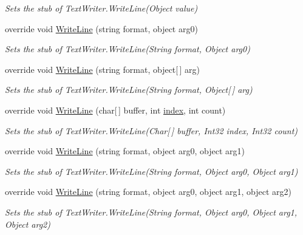 \begin{DoxyCompactItemize}
\begin{DoxyCompactList}\small\item\em Sets the stub of Text\-Writer.\-Write\-Line(\-Object value)\end{DoxyCompactList}\item 
override void \hyperlink{class_system_1_1_i_o_1_1_fakes_1_1_stub_string_writer_a9399eba848835110b6f8b381db729217}{Write\-Line} (string format, object arg0)
\begin{DoxyCompactList}\small\item\em Sets the stub of Text\-Writer.\-Write\-Line(\-String format, Object arg0)\end{DoxyCompactList}\item 
override void \hyperlink{class_system_1_1_i_o_1_1_fakes_1_1_stub_string_writer_adcb3e7de6bdc96c16f9024c023ad8281}{Write\-Line} (string format, object\mbox{[}$\,$\mbox{]} arg)
\begin{DoxyCompactList}\small\item\em Sets the stub of Text\-Writer.\-Write\-Line(\-String format, Object\mbox{[}$\,$\mbox{]} arg)\end{DoxyCompactList}\item 
override void \hyperlink{class_system_1_1_i_o_1_1_fakes_1_1_stub_string_writer_a8146b234e7a472c2e43877a08dd1550a}{Write\-Line} (char\mbox{[}$\,$\mbox{]} buffer, int \hyperlink{jquery-1_810_82-vsdoc_8js_a75bb12d1f23302a9eea93a6d89d0193e}{index}, int count)
\begin{DoxyCompactList}\small\item\em Sets the stub of Text\-Writer.\-Write\-Line(\-Char\mbox{[}$\,$\mbox{]} buffer, Int32 index, Int32 count)\end{DoxyCompactList}\item 
override void \hyperlink{class_system_1_1_i_o_1_1_fakes_1_1_stub_string_writer_aab4cd0d0a6e5036b6289cf15032ade19}{Write\-Line} (string format, object arg0, object arg1)
\begin{DoxyCompactList}\small\item\em Sets the stub of Text\-Writer.\-Write\-Line(\-String format, Object arg0, Object arg1)\end{DoxyCompactList}\item 
override void \hyperlink{class_system_1_1_i_o_1_1_fakes_1_1_stub_string_writer_aa7c104b17411b40a13ad64e361c79cab}{Write\-Line} (string format, object arg0, object arg1, object arg2)
\begin{DoxyCompactList}\small\item\em Sets the stub of Text\-Writer.\-Write\-Line(\-String format, Object arg0, Object arg1, Object arg2)\end{DoxyCompactList}\item 

\end{DoxyCompactItemize}
